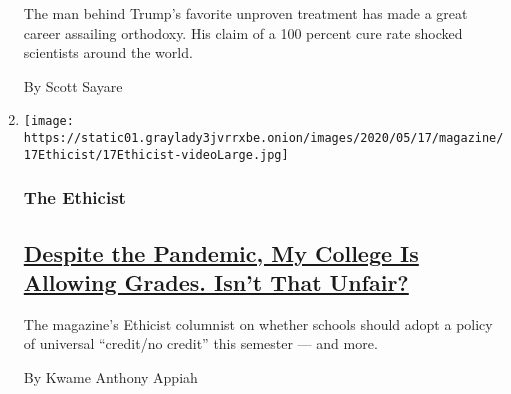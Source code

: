 \begin{enumerate}
  The man behind Trump's favorite unproven treatment has made a great
  career assailing orthodoxy. His claim of a 100 percent cure rate
  shocked scientists around the world.

  By Scott Sayare
\item
  \texttt{[image: https://static01.graylady3jvrrxbe.onion/images/2020/05/17/magazine/17Ethicist/17Ethicist-videoLarge.jpg]}

  \hypertarget{the-ethicist}{%
  \subsubsection{The Ethicist}\label{the-ethicist}}

  \hypertarget{despite-the-pandemic-my-college-is-allowing-grades-isnt-that-unfair}{%
  \subsection{\texorpdfstring{\href{/2020/05/12/magazine/despite-the-pandemic-my-college-is-allowing-grades-isnt-that-unfair.html}{Despite
  the Pandemic, My College Is Allowing Grades. Isn't That
  Unfair?}}{Despite the Pandemic, My College Is Allowing Grades. Isn't That Unfair?}}\label{despite-the-pandemic-my-college-is-allowing-grades-isnt-that-unfair}}

  The magazine's Ethicist columnist on whether schools should adopt a
  policy of universal ``credit/no credit'' this semester --- and more.

  By Kwame Anthony Appiah
\end{enumerate}

